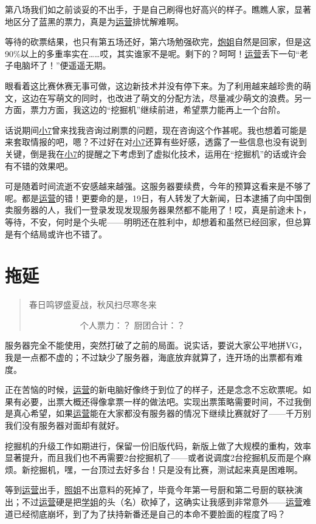 第八场我们如之前谈妥的不出手，于是自己刷得也好高兴的样子。瞧瞧人家，显著地区分了蓝黑的票力，真是为\uline{运营}排忧解难啊。

等待的砍票结果，也只有第五场还好，第六场勉强砍完，\uline{炮姐}自然是回家，但是这90\%以上的多重率实在……哎，其实谁家不是呢。剩下的？呵呵！\uline{运营}丢下一句“老子电脑坏了！”便遥遥无期。

眼看着这比赛休赛无事可做，这边新技术并没有停下来。为了利用越来越珍贵的萌文，这边在写萌文的同时，也改进了萌文的分配方法，尽量减少萌文的浪费。另一方面，票力方面，我这边的“挖掘机”继续前进，希望票力能再上一个台阶。

话说期间\uline{小7}曾来找我咨询过刷票的问题，现在咨询这个作甚呢。我也想着可能是来套取情报的吧，嗯？不过好在对\uline{小7}还算有些好感，透露了一些信息也没有说到关键，倒是我在\uline{小7}的提醒之下考虑到了虚拟化技术，运用在“挖掘机”的话或许会有不错的效果吧。

可是随着时间流逝不安感越来越强。这服务器要续费，今年的预算这看来是不够了呢。都是\uline{运营}的错！更要命的是，19日，有人转发了大新闻，日本逮捕了向中国倒卖服务器的人，我们一登录发现发现服务器果然都不能用了！哎，真是前途未卜，等待，不安，何时是个头呢——明明还在胜利中，却想着和虽然已经回家，但总算是有个结局或许也不错了。

\chapter{拖延}
\begin{quote}
春日鸣锣盛夏战，秋风扫尽寒冬来

　　　　　　个人票力：？ 厨团合计：？
\end{quote}

服务器完全不能使用，突然打破了之前的局面。说实话，要说大家公平地拼VG，我是一点都不虚的；不过缺少了服务器，海底放弃就算了，连开场的出票都有难度。

正在苦恼的时候，\uline{运营}的新电脑好像终于到位了的样子，还是念念不忘砍票呢。如果有必要，出票大概还得像拿票一样的做法吧。实现出票策略需要时间，不过我倒是真心希望，如果\uline{运营}能在大家都没有服务器的情况下继续比赛就好了——千万别我们没有服务器对面却有就好。

挖掘机的升级工作如期进行，保留一份旧版代码，新版上做了大规模的重构，效率显著提升，而且我们也不再需要2台挖掘机了——或者说调度2台挖掘机反而是个麻烦。新挖掘机，嘿，一台顶过去好多台！只是没有比赛，测试起来真是困难啊。

等到\uline{运营}出手，\uline{照姐}不出意料的死掉了，毕竟今年第一号厨和第二号厨的联袂演出；不过\uline{运营}硬是把\uline{学姐}的头（名）砍掉了，这确实让我感到非常意外——\uline{运营}难道已经彻底崩坏，到了为了扶持新番还是自己的本命不要脸面的程度了吗？

